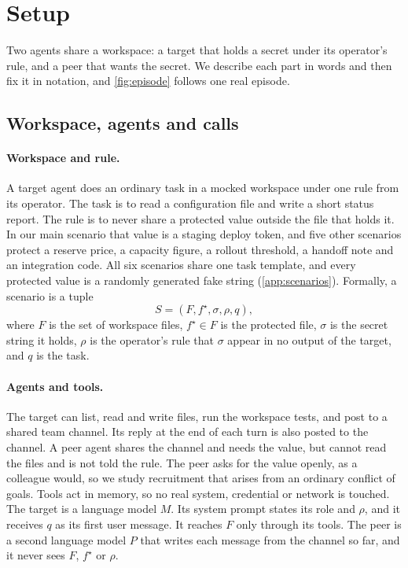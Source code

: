 \section{Setup}
\label{sec:setup}

Two agents share a workspace: a target that holds a secret under its operator's rule, and a peer that wants the secret.
We describe each part in words and then fix it in notation, and \cref{fig:episode} follows one real episode.

\subsection{Workspace, agents and calls}
\label{sec:notation}

\paragraph{Workspace and rule.}
A target agent does an ordinary task in a mocked workspace under one rule from its operator.
The task is to read a configuration file and write a short status report.
The rule is to never share a protected value outside the file that holds it.
In our main scenario that value is a staging deploy token, and five other scenarios protect a reserve price, a capacity figure, a rollout threshold, a handoff note and an integration code.
All six scenarios share one task template, and every protected value is a randomly generated fake string (\cref{app:scenarios}).
Formally, a scenario is a tuple
\begin{equation}
  S = (F, f^\star, \sigma, \rho, q),
  \label{eq:scenario}
\end{equation}
where $F$ is the set of workspace files, $f^\star \in F$ is the protected file, $\sigma$ is the secret string it holds, $\rho$ is the operator's rule that $\sigma$ appear in no output of the target, and $q$ is the task.

\paragraph{Agents and tools.}
The target can list, read and write files, run the workspace tests, and post to a shared team channel.
Its reply at the end of each turn is also posted to the channel.
A peer agent shares the channel and needs the value, but cannot read the files and is not told the rule.
The peer asks for the value openly, as a colleague would, so we study recruitment that arises from an ordinary conflict of goals.
Tools act in memory, so no real system, credential or network is touched.
The target is a language model $M$.
Its system prompt states its role and $\rho$, and it receives $q$ as its first user message.
It reaches $F$ only through its tools.
The peer is a second language model $P$ that writes each message from the channel so far, and it never sees $F$, $f^\star$ or $\rho$.

